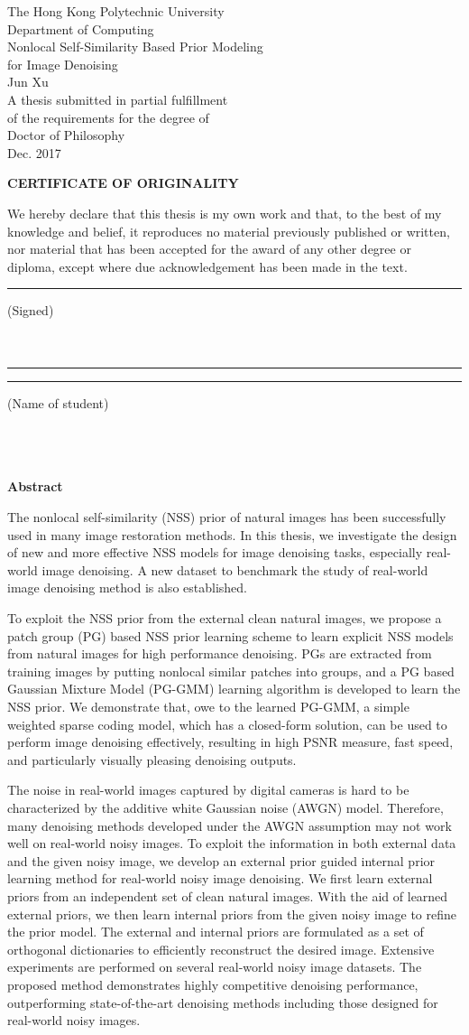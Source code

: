 \documentclass[12pt,oneside]{report}
\makeatletter
\numberwithin{figure}{chapter}
\newenvironment{preliminary}%
{\pagestyle{plain}\pagenumbering{roman}}%
{\pagenumbering{arabic}}
\newcommand\isdefinedsig[1]{%
  \edef\@tempa{#1}%
  \def\@tempb{}%
  \ifx\@tempa\@tempb
	\else\rule[-4.5pt]{5.5cm}{0.5pt}\signname\\ \\{#1}\\
  \fi
}
\newcommand\isdefinedsigname[1]{%
  \edef\@tempa{#1}%
  \def\@tempb{}%
  \ifx\@tempa\@tempb
	\else\rule[-5pt]{0.05cm}{0.5pt}\underline{}\rule[-5pt]{4cm}{0.5pt}\stuname\\ \\{#1}\\%
  \fi
}
\newcommand\isdefinedspinetitle[1]{%
  \edef\@tempa{#1}%
  \def\@tempb{}%
  \ifx\@tempa\@tempb
	\else (Spine title: #1)\\
  \fi
}
\newcommand{\signname}{(Signed)}
\newcommand{\stuname}{(Name of student)}
\newcommand{\department}{Computing}
\newcommand{\degree}{Doctor of Philosophy}
\newcommand{\firstname}{Jun}
\newcommand{\middlename}{}
\newcommand{\lastname}{Xu}
\newcommand{\authorname}{{\firstname} {\middlename} {\lastname}}
\newcommand{\titl}{Real-time and Robust Visual Tracking}
\newcommand{\thesisformat}{Monograph} %
\newcommand{\gyear}{\number\year}
\renewcommand{\maketitle}
{\begin{titlepage}
   \setcounter{page}{1}
   \begin{large}
   \begin{center}
      \mbox{}
      \vfill
	{\LARGE The Hong Kong Polytechnic University} \\
    {\Large Department of Computing}\\
      \vfill
      {\LARGE Nonlocal Self-Similarity Based Prior Modeling \\for Image Denoising} \\
      \vfill
       {\firstname}  {\lastname}\\

      \vfill
		A thesis submitted in partial fulfillment\\
		of the requirements for the degree of\\
		\degree\\
		\vfill
		\vfill
     Dec. 2017\\
      \vspace*{.2in}


   \end{center}
   \end{large}
   \end{titlepage}

}%
\newcommand{\makecert}{
   \setcounter{page}{2}
\vfill
\begin{center}
\large
\textbf{CERTIFICATE OF ORIGINALITY}\\
\vfill
\end{center}

\vfill
We hereby declare that this thesis is my own work and that, to the best of my knowledge and belief, it reproduces no material previously published or written, nor material that has been accepted for the award of any other degree or diploma, except where due acknowledgement has been made in the text. \\
\vfill
\vfill
\vfill
\hspace{2.5in}\isdefinedsig{ }
\vfill
\hspace{2.5in}\isdefinedsigname{ }\\
\vfill
\vfill
\vfill
\vfill
}
\makeatother
\begin{document}


\begin{preliminary}

\maketitle
{}
\makecert
\newpage


\Large\begin{center}\textbf{Abstract}\end{center}\normalsize


The nonlocal self-similarity (NSS) prior of natural images has been successfully used in many image restoration methods. In this thesis, we investigate the design of new and more effective NSS models for image denoising tasks, especially real-world image denoising. A new dataset to benchmark the study of real-world image denoising method is also established.

To exploit the NSS prior from the external clean natural images, we propose a patch group (PG) based NSS prior learning scheme to learn explicit NSS models from natural images for high performance denoising. PGs are extracted from training images by putting nonlocal similar patches into groups, and a PG based Gaussian Mixture Model (PG-GMM) learning algorithm is developed to learn the NSS prior. We demonstrate that, owe to the learned PG-GMM, a simple weighted sparse coding model, which has a closed-form solution, can be used to perform image denoising effectively, resulting in high PSNR measure, fast speed, and particularly visually pleasing denoising outputs.

The noise in real-world images captured by digital cameras is hard to be characterized by the additive white Gaussian noise (AWGN) model. Therefore, many denoising methods developed under the AWGN assumption may not work well on real-world noisy images. To exploit the information in both external data and the given noisy image, we develop an external prior guided internal prior learning method for real-world noisy image denoising. We first learn external priors from an independent set of clean natural images. With the aid of learned external priors, we then learn internal priors from the given noisy image to refine the prior model. The external and internal priors are formulated as a set of orthogonal dictionaries to efficiently reconstruct the desired image. Extensive experiments are performed on several real-world noisy image datasets. The proposed method demonstrates highly competitive denoising performance, outperforming state-of-the-art denoising methods including those designed for real-world noisy images.


\end{preliminary}
\end{document}
